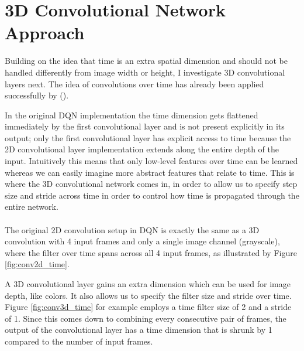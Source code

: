 \section{3D Convolutional Network Approach}
\label{sec:3d_convolutional_network_approach}
Building on the idea that time is an extra spatial dimension
and should not be handled differently
from image width or height,
I investigate 3D convolutional layers next.
The idea of convolutions over time has already been
applied successfully by \citeauthor{claessens} (\citeyear{claessens}).

In the original DQN implementation
the time dimension gets flattened immediately
by the first convolutional layer
and is not present explicitly
in its output;
only the first convolutional layer
has explicit access to time
because the 2D convolutional layer implementation
extends along the entire depth of the input.
Intuitively this means that only low-level
features over time can be learned
whereas we can easily imagine
more abstract features
that relate to time.
This is where the 3D convolutional network comes in,
in order to allow us to specify step size and stride across time
in order to control how time is propagated through the entire network.

\paragraph{}
The original 2D convolution setup in DQN
is exactly the same as a 3D convolution
with 4 input frames and only a single image channel (grayscale),
where the filter over time spans across all 4 input frames,
as illustrated by Figure \ref{fig:conv2d_time}.

A 3D convolutional layer gains an extra dimension
which can be used for image depth, like colors.
It also allows us to specify the filter size and stride over time.
Figure \ref{fig:conv3d_time} for example
employs a time filter size of 2 and a stride of 1.
Since this comes down to combining every consecutive pair of frames,
the output of the convolutional layer has a time dimension
that is shrunk by 1 compared to the number of input frames.

